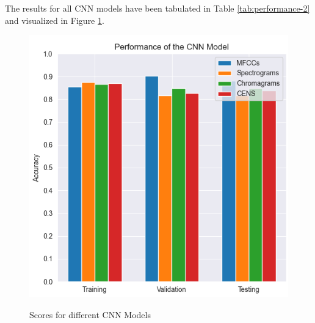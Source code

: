 \documentclass[10pt,twocolumn,letterpaper]{article}
\begin{document}
\begin{table}[htbp]
\caption{Scores for different CNN Models}
\label{tab:performance-2}
\end{table}

The results for all CNN models have been tabulated in Table \ref{tab:performance-2} and visualized in Figure \ref{fig:cnn_accuracies}.

\begin{figure}[htbp]
\centering
\includegraphics[scale=0.4]{cnn_accuracies.png} \\
\caption{Scores for different CNN Models}
\label{fig:cnn_accuracies}
\end{figure}
\end{document}
